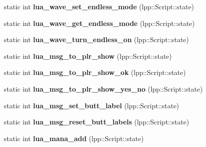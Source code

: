 \begin{DoxyCompactItemize}
\item 
static int {\bfseries lua\+\_\+wave\+\_\+set\+\_\+endless\+\_\+mode} (lpp\+::\+Script\+::state)\hypertarget{class_lua_interface_ab1ee8da6b81cfd9e9f657e3dd0b80cd2}{}\label{class_lua_interface_ab1ee8da6b81cfd9e9f657e3dd0b80cd2}

\item 
static int {\bfseries lua\+\_\+wave\+\_\+get\+\_\+endless\+\_\+mode} (lpp\+::\+Script\+::state)\hypertarget{class_lua_interface_ab8618bf05a35a6c463e5dabeef875352}{}\label{class_lua_interface_ab8618bf05a35a6c463e5dabeef875352}

\item 
static int {\bfseries lua\+\_\+wave\+\_\+turn\+\_\+endless\+\_\+on} (lpp\+::\+Script\+::state)\hypertarget{class_lua_interface_a64e08cf8a2c20902183a59d6baf0f2d1}{}\label{class_lua_interface_a64e08cf8a2c20902183a59d6baf0f2d1}

\item 
static int {\bfseries lua\+\_\+msg\+\_\+to\+\_\+plr\+\_\+show} (lpp\+::\+Script\+::state)\hypertarget{class_lua_interface_a719dac641aa400bc1f0c317802c7dced}{}\label{class_lua_interface_a719dac641aa400bc1f0c317802c7dced}

\item 
static int {\bfseries lua\+\_\+msg\+\_\+to\+\_\+plr\+\_\+show\+\_\+ok} (lpp\+::\+Script\+::state)\hypertarget{class_lua_interface_a7eb8260252c99036c5d4f7db7b836223}{}\label{class_lua_interface_a7eb8260252c99036c5d4f7db7b836223}

\item 
static int {\bfseries lua\+\_\+msg\+\_\+to\+\_\+plr\+\_\+show\+\_\+yes\+\_\+no} (lpp\+::\+Script\+::state)\hypertarget{class_lua_interface_afde770fe4ed188c8c81f32968818eeaf}{}\label{class_lua_interface_afde770fe4ed188c8c81f32968818eeaf}

\item 
static int {\bfseries lua\+\_\+msg\+\_\+set\+\_\+butt\+\_\+label} (lpp\+::\+Script\+::state)\hypertarget{class_lua_interface_a3cff1cf8a6a233ec736dd5be72ad8c72}{}\label{class_lua_interface_a3cff1cf8a6a233ec736dd5be72ad8c72}

\item 
static int {\bfseries lua\+\_\+msg\+\_\+reset\+\_\+butt\+\_\+labels} (lpp\+::\+Script\+::state)\hypertarget{class_lua_interface_abeb94529bfb0c55b93ac61e54b22609c}{}\label{class_lua_interface_abeb94529bfb0c55b93ac61e54b22609c}

\item 
static int {\bfseries lua\+\_\+mana\+\_\+add} (lpp\+::\+Script\+::state)\hypertarget{class_lua_interface_a2ed91b2e42f55a55a396c1d5d9b4fb0d}{}\label{class_lua_interface_a2ed91b2e42f55a55a396c1d5d9b4fb0d}


\end{DoxyCompactItemize}
